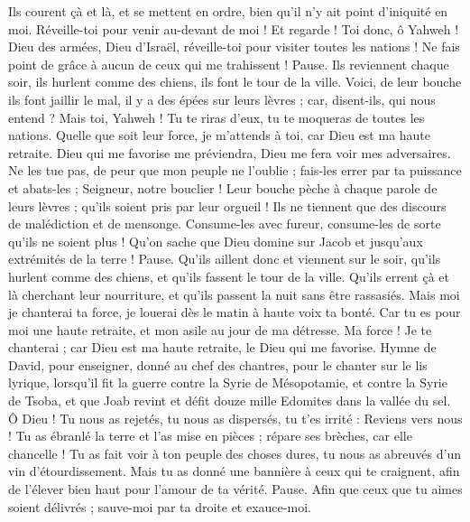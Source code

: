 \begin{multicols}{2}
Ils courent çà et là, et se mettent en ordre, bien qu'il n'y ait point d'iniquité en moi. Réveille-toi pour venir au-devant de moi ! Et regarde !
Toi donc, ô Yahweh ! Dieu des armées, Dieu d'Israël, réveille-toi pour visiter toutes les nations ! Ne fais point de grâce à aucun de ceux qui me trahissent ! Pause.
Ils reviennent chaque soir, ils hurlent comme des chiens, ils font le tour de la ville.
Voici, de leur bouche ils font jaillir le mal, il y a des épées sur leurs lèvres ; car, disent-ils, qui nous entend ?
Mais toi, Yahweh ! Tu te riras d'eux, tu te moqueras de toutes les nations.
Quelle que soit leur force, je m'attends à toi, car Dieu est ma haute retraite.
Dieu qui me favorise me préviendra, Dieu me fera voir mes adversaires.
Ne les tue pas, de peur que mon peuple ne l'oublie ; fais-les errer par ta puissance et abats-les ; Seigneur, notre bouclier !
Leur bouche pèche à chaque parole de leurs lèvres ; qu'ils soient pris par leur orgueil ! Ils ne tiennent que des discours de malédiction et de mensonge.
Consume-les avec fureur, consume-les de sorte qu'ils ne soient plus ! Qu'on sache que Dieu domine sur Jacob et jusqu'aux extrémités de la terre ! Pause.
Qu'ils aillent donc et viennent sur le soir, qu'ils hurlent comme des chiens, et qu'ils fassent le tour de la ville.
Qu'ils errent çà et là cherchant leur nourriture, et qu'ils passent la nuit sans être rassasiés.
Mais moi je chanterai ta force, je louerai dès le matin à haute voix ta bonté. Car tu es pour moi une haute retraite, et mon asile au jour de ma détresse.
Ma force ! Je te chanterai ; car Dieu est ma haute retraite, le Dieu qui me favorise.
\VerseOne{}Hymne de David, pour enseigner, donné au chef des chantres, pour le chanter sur le lis lyrique,
lorsqu’il fit la guerre contre la Syrie de Mésopotamie, et contre la Syrie de Tsoba, et que Joab revint et défit douze mille Edomites dans la vallée du sel.
Ô Dieu ! Tu nous as rejetés, tu nous as dispersés, tu t'es irrité : Reviens vers nous !
Tu as ébranlé la terre et l'as mise en pièces ; répare ses brèches, car elle chancelle !
Tu as fait voir à ton peuple des choses dures, tu nous as abreuvés d’un vin d'étourdissement.
Mais tu as donné une bannière à ceux qui te craignent, afin de l'élever bien haut pour l'amour de ta vérité. Pause.
Afin que ceux que tu aimes soient délivrés ; sauve-moi par ta droite et exauce-moi.

\end{multicols}
